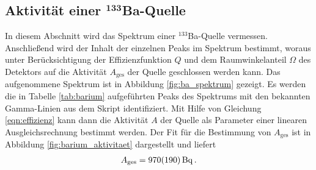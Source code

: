 \subsection[Aktivität einer $^{133}$Ba-Quelle]%
    {Aktivität einer $\mathbf{^{133}}$Ba-Quelle} %
\label{sub:ba_quelle}
In diesem Abschnitt wird das Spektrum einer $^{133}$Ba-Quelle vermessen.
Anschließend wird der Inhalt der einzelnen Peaks im Spektrum bestimmt,
woraus unter Berücksichtigung der Effizienzfunktion $Q$ und dem
Raumwinkelanteil $\Omega$ des Detektors auf die Aktivität $A_\text{ges}$
der Quelle geschlossen werden kann.
Das aufgenommene Spektrum ist in Abbildung \ref{fig:ba_spektrum} gezeigt.
Es werden die in Tabelle \ref{tab:barium} aufgeführten Peaks des Spektrums
mit den bekannten Gamma-Linien aus dem Skript identifiziert.
Mit Hilfe von Gleichung \eqref{eqn:effizienz} kann dann die Aktivität $A$
der Quelle als Parameter einer linearen Ausgleichsrechnung bestimmt werden.
Der Fit für die Bestimmung von $A_\text{ges}$ ist in Abbildung
\ref{fig:barium_aktivitaet} dargestellt und liefert
\begin{align*}
    A_\text{ges} = \SI{970+-190}{\becquerel}\,.
\end{align*}
